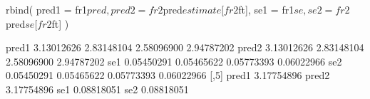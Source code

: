\begin{Schunk}
\begin{Sinput}
 rbind(
   pred1 = fr1$pred, pred2 = fr2$pred$estimate[fr2$ft],
   se1 = fr1$se, se2 = fr2$pred$se[fr2$ft]
 )
\end{Sinput}
\begin{Soutput}
            [,1]       [,2]       [,3]       [,4]
pred1 3.13012626 2.83148104 2.58096900 2.94787202
pred2 3.13012626 2.83148104 2.58096900 2.94787202
se1   0.05450291 0.05465622 0.05773393 0.06022966
se2   0.05450291 0.05465622 0.05773393 0.06022966
            [,5]
pred1 3.17754896
pred2 3.17754896
se1   0.08818051
se2   0.08818051
\end{Soutput}
\end{Schunk}
